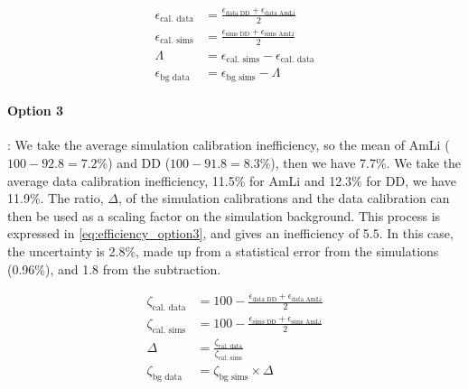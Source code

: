 \begin{align}
    \epsilon_{\textrm{cal. data}} &= \frac{\epsilon_{\textrm{data DD}} + \epsilon_{\textrm{data AmLi}}}{2} \\
    \epsilon_{\textrm{cal. sims}} &= \frac{\epsilon_{\textrm{sims DD}} + \epsilon_{\textrm{sims AmLi}}}{2} \\
    \Lambda &= \epsilon_{\textrm{cal. sims}} - \epsilon_{\textrm{cal. data}} \\
    \epsilon_{\textrm{bg data}} &= \epsilon_{\textrm{bg sims}} - \Lambda
    \label{eq:efficiency_option2} 
\end{align}

\paragraph{Option 3}:
We take the average simulation calibration inefficiency, so the mean of AmLi ($100 - 92.8 = 7.2$\%) and DD ($100 - 91.8 = 8.3$\%), then we have 7.7\%.
We take the average data calibration inefficiency, 11.5\% for AmLi and 12.3\% for DD, we have 11.9\%.
The ratio, $\Delta$, of the simulation calibrations and the data calibration can then be used as a scaling factor on the simulation background.
This process is expressed in \autoref{eq:efficiency_option3}, and gives an inefficiency of 5.5.
In this case, the uncertainty is 2.8\%, made up from a statistical error from the simulations (0.96\%), and 1.8 from the subtraction.

\begin{align}
    \zeta_{\textrm{cal. data}} &= 100 - \frac{\epsilon_{\textrm{data DD}} +\epsilon_{\textrm{data AmLi}}}{2} \\
    \zeta_{\textrm{cal. sims}} &= 100 - \frac{\epsilon_{\textrm{sims DD}} + \epsilon_{\textrm{sims AmLi}}}{2} \\
    \Delta &= \frac{\zeta_{\textrm{cal. data}}}{\zeta_{\textrm{cal. sims}}} \\
    \zeta_{\textrm{bg data}} &= \zeta_{\textrm{bg sims}} \times \Delta 
    \label{eq:efficiency_option3} 
\end{align}

